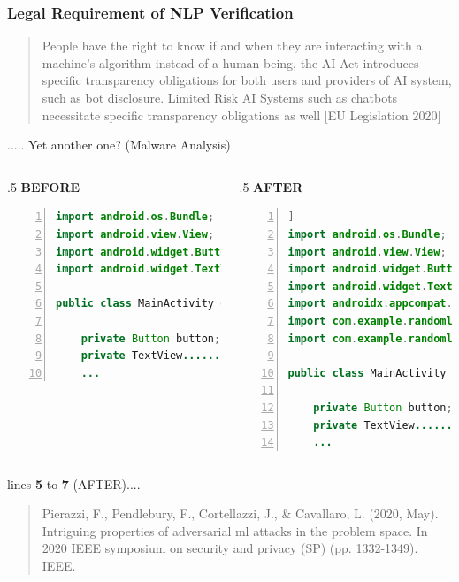 \documentclass[t,compress,aspectratio=169]{beamer}
\begin{document}
\begin{frame}
\frametitle{Legal Requirement of NLP Verification}

    \begin{quote}
        \textcolor{aisecpurple}{People have the right to know if and when they are interacting with a machine’s algorithm instead of a human being, the AI Act introduces specific transparency obligations for both users and providers of AI system, such as bot disclosure. Limited Risk AI Systems such as chatbots necessitate specific transparency obligations as well [EU Legislation 2020]}

    \end{quote}

\end{frame}


\begin{frame}[fragile]{..... Yet another one? (Malware Analysis)}
\begin{columns}
    
\begin{column}{.5\textwidth}
 \textcolor{aisecred}{\textbf{BEFORE}}
\
        \begin{lstlisting}[language=java,basicstyle=\tiny,numbers=left]
import android.os.Bundle;
import android.view.View;
import android.widget.Button;
import android.widget.TextView;

public class MainActivity extends AppCompatActivity {

    private Button button;
    private TextView........
    ...
        \end{lstlisting}
    \end{column}
    \begin{column}{.5\textwidth}
 \textcolor{aisecred}{\textbf{AFTER}}
                \begin{lstlisting}[language=java,basicstyle=\tiny,numbers=left]]
import android.os.Bundle;
import android.view.View;
import android.widget.Button;
import android.widget.TextView;
import androidx.appcompat.app.AppCompatActivity;
import com.example.randomlibrary1.RandomLibrary1;
import com.example.randomlibrary2.RandomLibrary2;

public class MainActivity extends AppCompatActivity {

    private Button button;
    private TextView........
    ...
        \end{lstlisting}
    \end{column}
\end{columns}
lines \textbf{5} to \textbf{7} (AFTER)....
\vfill
	\begin{quote}
		\tiny Pierazzi, F., Pendlebury, F., Cortellazzi, J., \& Cavallaro, L. (2020, May). Intriguing properties of adversarial ml attacks in the problem space. In 2020 IEEE symposium on security and privacy (SP) (pp. 1332-1349). IEEE.
		
	\end{quote}
\end{frame}
\end{document}
